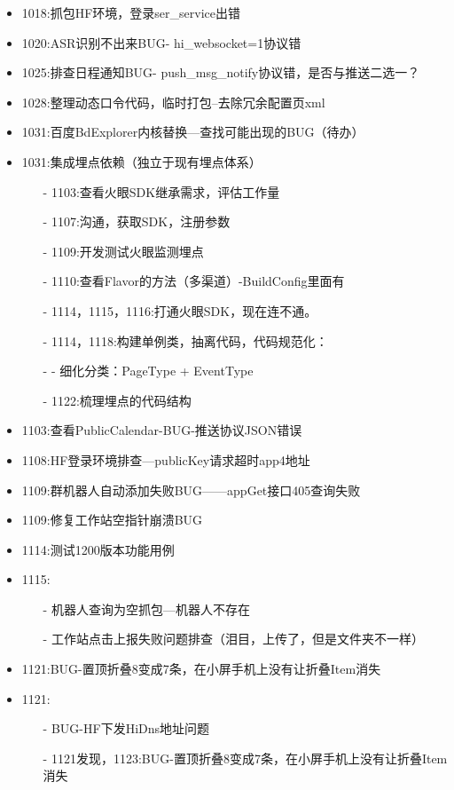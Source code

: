\documentclass[12pt,a4paper]{ctexart}
\begin{document}
\begin{itemize}
\begin{itemize}
		\end{itemize}
		\item 1018:抓包HF环境，登录ser\_service出错
		\item 1020:ASR识别不出来BUG- hi\_websocket=1协议错
		\item 1025:排查日程通知BUG- push\_msg\_notify协议错，是否与推送二选一？
		\item 1028:整理动态口令代码，临时打包--去除冗余配置页xml
		\item 1031:百度BdExplorer内核替换—查找可能出现的BUG（待办）
		\item 1031:集成埋点依赖（独立于现有埋点体系）
		\begin{itemize}
			\item[-] 1103:查看火眼SDK继承需求，评估工作量
			\item[-] 1107:沟通，获取SDK，注册参数
			\item[-] 1109:开发测试火眼监测埋点
			\item[-] 1110:查看Flavor的方法（多渠道）-BuildConfig里面有
			\item[-] 1114，1115，1116:打通火眼SDK，现在连不通。
			\item[-] 1114，1118:构建单例类，抽离代码，代码规范化：
			\item[-] -  细化分类：PageType + EventType
			\item[-] 1122:梳理埋点的代码结构
		\end{itemize}
		\item 1103:查看PublicCalendar-BUG-推送协议JSON错误
		\item 1108:HF登录环境排查—publicKey请求超时app4地址
		\item 1109:群机器人自动添加失败BUG——appGet接口405查询失败
		\item 1109:修复工作站空指针崩溃BUG
		\item 1114:测试1200版本功能用例
		\newpage
		\item 1115:
		\begin{itemize}
			\item[-] 机器人查询为空抓包—机器人不存在
			\item[-] 工作站点击上报失败问题排查（泪目，上传了，但是文件夹不一样）
		\end{itemize}
		\item 1121:BUG-置顶折叠8变成7条，在小屏手机上没有让折叠Item消失
		\item 1121:
		\begin{itemize}
			\item[-] BUG-HF下发HiDns地址问题
			\item[-] 1121发现，1123:BUG-置顶折叠8变成7条，在小屏手机上没有让折叠Item消失

\end{itemize}
\end{itemize}
\end{document}
